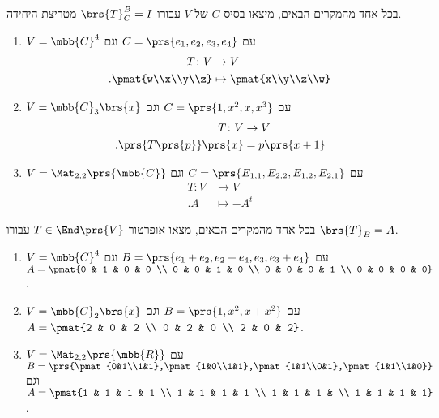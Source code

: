 \documentclass[a4paper,10pt,twoside,openany]{article}
\begin{document}
\begin{exercise}
בכל אחד מהמקרים הבאים, מיצאו בסיס
$C$
של
$V$
עבורו
$\brs{T}^B_C = I$
מטריצת היחידה.

\begin{enumerate}
\item $V = \mbb{C}^4$
עם
$C = \prs{e_1, e_2, e_3, e_4}$
וגם
\begin{align*}
T \colon V &\to V \\
\text{.} \pmat{w\\x\\y\\z} &\mapsto \pmat{x\\y\\z\\w}
\end{align*}

\item $V = \mbb{C}_3\brs{x}$
עם
$C = \prs{1,x^2,x,x^3}$
וגם
\begin{align*}
T \colon V &\to V \\
\text{.} \prs{T\prs{p}}\prs{x} &= p\prs{x+1}
\end{align*}

\item $V = \Mat_{2,2}\prs{\mbb{C}}$
עם
$C = \prs{E_{1,1}, E_{2,2}, E_{1,2}, E_{2,1}}$
וגם
\begin{align*}
T \colon V &\to V \\
\text{.} A &\mapsto -A^t
\end{align*}
\end{enumerate}
\end{exercise}

\begin{exercise}
בכל אחד מהמקרים הבאים, מצאו אופרטור
$T \in \End\prs{V}$
עבורו
$\brs{T}_B = A$.

\begin{enumerate}
\item $V = \mbb{C}^4$
עם
$B = \prs{e_1+e_2,e_2+e_4,e_3,e_3+e_4}$
וגם
$A = \pmat{0 & 1 & 0 & 0 \\ 0 & 0 & 1 & 0 \\ 0 & 0 & 0 & 1 \\ 0 & 0 & 0 & 0}$.

\item $V = \mbb{C}_2\brs{x}$
עם
$B = \prs{1,x^2,x+x^2}$
וגם
$A = \pmat{2 & 0 & 2 \\ 0 & 2 & 0 \\ 2 & 0 & 2}$.

\item $V = \Mat_{2,2}\prs{\mbb{R}}$
עם
$B = \prs{\pmat{0&1\\1&1},\pmat{1&0\\1&1},\pmat{1&1\\0&1},\pmat{1&1\\1&0}}$
וגם
$A = \pmat{1 & 1 & 1 & 1 \\ 1 & 1 & 1 & 1 \\ 1 & 1 & 1 & \\ 1 & 1 & 1 & 1}$.
\end{enumerate}
\end{exercise}
\end{document}
